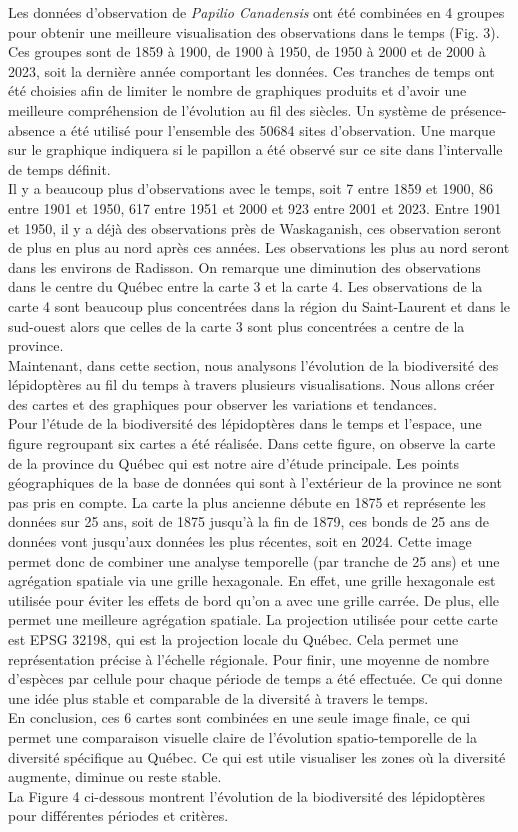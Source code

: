 \documentclass[9pt,twocolumn,twoside,]{pnas-new}
\begin{document}
Les données d'observation de \emph{Papilio Canadensis} ont été combinées
en 4 groupes pour obtenir une meilleure visualisation des observations
dans le temps (Fig. 3). Ces groupes sont de 1859 à 1900, de 1900 à 1950,
de 1950 à 2000 et de 2000 à 2023, soit la dernière année comportant les
données. Ces tranches de temps ont été choisies afin de limiter le
nombre de graphiques produits et d'avoir une meilleure compréhension de
l'évolution au fil des siècles. Un système de présence-absence a été
utilisé pour l'ensemble des 50684 sites d'observation. Une marque sur le
graphique indiquera si le papillon a été observé sur ce site dans
l'intervalle de temps définit.\\
Il y a beaucoup plus d'observations avec le temps, soit 7 entre 1859 et
1900, 86 entre 1901 et 1950, 617 entre 1951 et 2000 et 923 entre 2001 et
2023. Entre 1901 et 1950, il y a déjà des observations près de
Waskaganish, ces observation seront de plus en plus au nord après ces
années. Les observations les plus au nord seront dans les environs de
Radisson. On remarque une diminution des observations dans le centre du
Québec entre la carte 3 et la carte 4. Les observations de la carte 4
sont beaucoup plus concentrées dans la région du Saint-Laurent et dans
le sud-ouest alors que celles de la carte 3 sont plus concentrées a
centre de la province.\\
Maintenant, dans cette section, nous analysons l'évolution de la
biodiversité des lépidoptères au fil du temps à travers plusieurs
visualisations. Nous allons créer des cartes et des graphiques pour
observer les variations et tendances.\\
Pour l'étude de la biodiversité des lépidoptères dans le temps et
l'espace, une figure regroupant six cartes a été réalisée. Dans cette
figure, on observe la carte de la province du Québec qui est notre aire
d'étude principale. Les points géographiques de la base de données qui
sont à l'extérieur de la province ne sont pas pris en compte. La carte
la plus ancienne débute en 1875 et représente les données sur 25 ans,
soit de 1875 jusqu'à la fin de 1879, ces bonds de 25 ans de données vont
jusqu'aux données les plus récentes, soit en 2024. Cette image permet
donc de combiner une analyse temporelle (par tranche de 25 ans) et une
agrégation spatiale via une grille hexagonale. En effet, une grille
hexagonale est utilisée pour éviter les effets de bord qu'on a avec une
grille carrée. De plus, elle permet une meilleure agrégation spatiale.
La projection utilisée pour cette carte est EPSG 32198, qui est la
projection locale du Québec. Cela permet une représentation précise à
l'échelle régionale. Pour finir, une moyenne de nombre d'espèces par
cellule pour chaque période de temps a été effectuée. Ce qui donne une
idée plus stable et comparable de la diversité à travers le temps.\\
En conclusion, ces 6 cartes sont combinées en une seule image finale, ce
qui permet une comparaison visuelle claire de l'évolution
spatio-temporelle de la diversité spécifique au Québec. Ce qui est utile
visualiser les zones où la diversité augmente, diminue ou reste
stable.\\
La Figure 4 ci-dessous montrent l'évolution de la biodiversité des
lépidoptères pour différentes périodes et critères.
\end{document}
